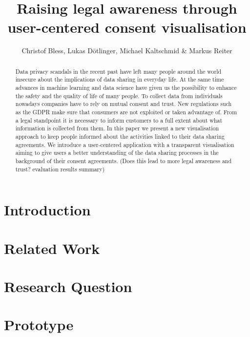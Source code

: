 \documentclass[notitlepage,11pt]{article}
\begin{document}
\title{Raising legal awareness through user-centered consent visualisation}
\author{Christof Bless, Lukas Dötlinger, Michael Kaltschmid \& Markus Reiter}
\maketitle
\begin{abstract}
  Data privacy scandals in the recent past have left many people around the world
  insecure about the implications of data sharing in everyday life. At the
  same time advances in machine learning and data science have given us the
  possibility to enhance the safety and the quality of life of many people. To
  collect data from individuals nowadays companies have to rely on mutual
  consent and trust. New regulations such as the GDPR make sure that consumers
  are not exploited or taken advantage of. From a legal standpoint it is
  necessary to inform customers to a full extent about what information is
  collected from them. In this paper we present a new visualisation approach
  to keep people informed about the activities linked to their data sharing
  agreements. We introduce a user-centered application with a transparent
  visualisation aiming to give users a better understanding of the data sharing
  processes in the background of their consent agreements. (Does this lead to
  more legal awareness and trust? evaluation results summary)
\end{abstract}

\section{Introduction}
\label{sec:introduction}


\section{Related Work}
\label{sec:related_work}


\section{Research Question}
\label{sec:research_question}


\section{Prototype}
\label{sec:prototyping}

\end{document}
